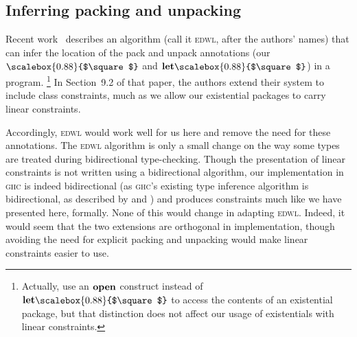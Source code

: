 \documentclass[acmsmall,usenames,dvipsnames,natbib=false,acmthm=false,screen]{acmart}
\newcommand{\keyword}[1]{\mathbf{#1}}
\newcommand{\klet}{\keyword{let}}
\newcommand{\packbox}{\raisebox{-0.08ex}{\scalebox{0.88}{$\square$}}}
\newcommand{\kunpack}{\klet\packbox}
\theoremstyle{acmplain}
\theoremstyle{acmdefinition}
\begin{document}
\subsection{Inferring packing and unpacking}
\label{sec:implicit-existentials}
Recent work~\cite{existentials} describes an algorithm (call it \textsc{edwl}, after the
authors' names) that
can infer the location of the pack and unpack annotations (our $\packbox$ and $\kunpack$)
in a program.%
\footnote{Actually, \citet{existentials} use an $\mathbf{open}$ construct instead of $\kunpack$
to access the contents of an existential package, but that distinction does
not affect our usage of existentials with linear constraints.}
In Section~9.2 of that paper,
the authors extend their system to include class constraints,
much as we allow our existential packages to carry linear constraints.

Accordingly, \textsc{edwl} would work well for us here and remove the need for these annotations.
The \textsc{edwl} algorithm is only a small change on the way some types are treated during
bidirectional type-checking. Though the presentation of linear constraints is not
written using a bidirectional algorithm, our implementation in \textsc{ghc}
is indeed bidirectional (as \textsc{ghc}'s existing type inference algorithm
is bidirectional, as described by \citet{practical-type-inference} and
\citet{visible-type-application}) and produces constraints much like we
have presented here, formally. None of this would change in adapting \textsc{edwl}.
Indeed, it would seem that the two extensions are orthogonal in implementation,
though avoiding the need for explicit packing and unpacking would
make linear constraints easier to use.



\end{document}
